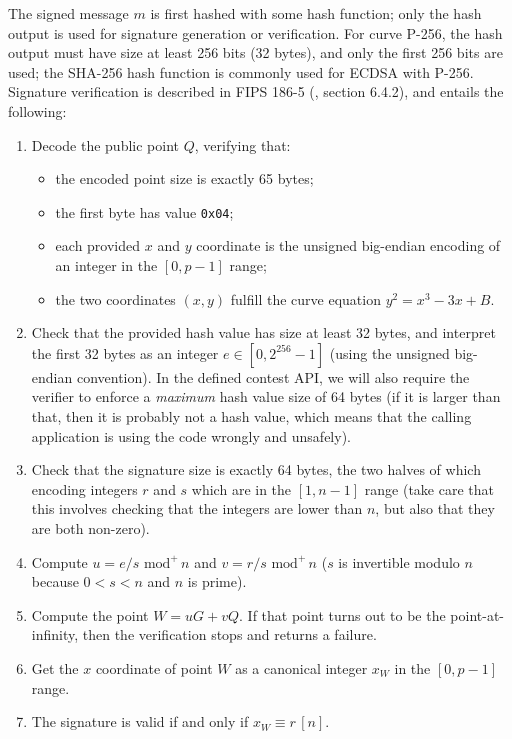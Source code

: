 \documentclass{llncs}
\newcommand{\eqvm}[3]{#1 \equiv #2 \,[#3]}
\newcommand{\umod}[2]{#1 \,\,\text{mod}^{+}\, #2}
\begin{document}
The signed message $m$ is first hashed with some hash function; only the
hash output is used for signature generation or verification. For curve
P-256, the hash output must have size at least 256 bits (32 bytes), and
only the first 256 bits are used; the SHA-256 hash function is commonly
used for ECDSA with P-256. Signature verification is described in FIPS
186-5 (\cite{Fips186}, section 6.4.2), and entails the following:
\begin{enumerate}

    \item Decode the public point $Q$, verifying that:
    \begin{itemize}
        \item the encoded point size is exactly 65 bytes;
        \item the first byte has value \verb+0x04+;
        \item each provided $x$ and $y$ coordinate is the unsigned
        big-endian encoding of an integer in the $[0, p-1]$ range;
        \item the two coordinates $(x,y)$ fulfill the curve equation
        $y^2 = x^3 - 3x + B$.
    \end{itemize}

    \item Check that the provided hash value has size at least 32 bytes,
    and interpret the first 32 bytes as an integer $e \in [0, 2^{256}-1]$
    (using the unsigned big-endian convention). In the defined contest
    API, we will also require the verifier to enforce a \emph{maximum}
    hash value size of 64 bytes (if it is larger than that, then it is
    probably not a hash value, which means that the calling application
    is using the code wrongly and unsafely).

    \item Check that the signature size is exactly 64 bytes, the two
    halves of which encoding integers $r$ and $s$ which are in the
    $[1, n-1]$ range (take care that this involves checking that the
    integers are lower than $n$, but also that they are both non-zero).

    \item Compute $u = \umod{e/s}{n}$ and $v = \umod{r/s}{n}$ ($s$ is
    invertible modulo $n$ because $0 < s < n$ and $n$ is prime).

    \item Compute the point $W = uG + vQ$. If that point turns out to be
    the point-at-infinity, then the verification stops and returns a
    failure.

    \item Get the $x$ coordinate of point $W$ as a canonical integer $x_W$
    in the $[0, p-1]$ range.

    \item The signature is valid if and only if $\eqvm{x_W}{r}{n}$.

\end{enumerate}
\end{document}
